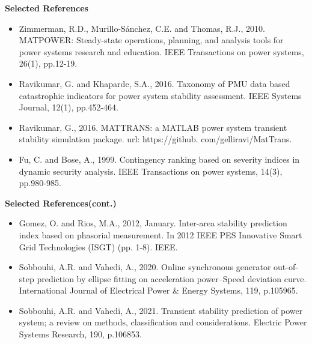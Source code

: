 \documentclass [xcolor=svgnames, t] {beamer}
\begin{document}
\begin{frame}{\textbf{Selected References}}
\begin{itemize} \justifying
\item Zimmerman, R.D., Murillo-Sánchez, C.E. and Thomas, R.J., 2010. MATPOWER: Steady-state operations, planning, and analysis tools for power systems research and education. IEEE Transactions on power systems, 26(1), pp.12-19.
\item Ravikumar, G. and Khaparde, S.A., 2016. Taxonomy of PMU data based catastrophic indicators for power system stability assessment. IEEE Systems Journal, 12(1), pp.452-464.
\item Ravikumar, G., 2016. MATTRANS: a MATLAB power system transient stability simulation package. url: https://github. com/gelliravi/MatTrans.
\item Fu, C. and Bose, A., 1999. Contingency ranking based on severity indices in dynamic security analysis. IEEE Transactions on power systems, 14(3), pp.980-985.


\end{itemize}
\end{frame}

\begin{frame}{\textbf{Selected References(cont.)}}
\begin{itemize} \justifying
\item Gomez, O. and Rios, M.A., 2012, January. Inter-area stability prediction index based on phasorial measurement. In 2012 IEEE PES Innovative Smart Grid Technologies (ISGT) (pp. 1-8). IEEE.
\item Sobbouhi, A.R. and Vahedi, A., 2020. Online synchronous generator out-of-step prediction by ellipse fitting on acceleration power–Speed deviation curve. International Journal of Electrical Power \&  Energy Systems, 119, p.105965.
\item Sobbouhi, A.R. and Vahedi, A., 2021. Transient stability prediction of power system; a review on methods, classification and considerations. Electric Power Systems Research, 190, p.106853.


\end{itemize}
\end{frame}
\end{document}
